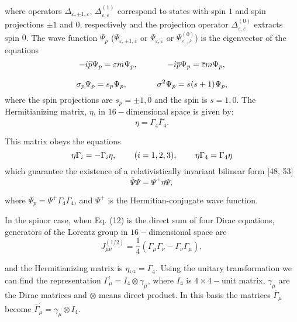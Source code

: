 \documentclass[a4paper,12pt]{article}
\begin{document}
where operators $\Delta _{\varepsilon ,\pm 1,\overline{\varepsilon
}}$, $ \Delta _{\varepsilon ,\overline{\varepsilon }}^{(1)}$
correspond to states with spin $1$ and spin projections $\pm 1$
and $0$, respectively and the projection operator $\Delta
_{\varepsilon ,\overline{\varepsilon }}^{(0)}$ extracts spin $0$.
The wave function $\Psi _p$ ($\Psi _{\varepsilon ,\pm 1,
\overline{\varepsilon }}$ or $\Psi _{\varepsilon
,\overline{\varepsilon }}$ or $\Psi _{\varepsilon
,,\overline{\varepsilon }}^{(0)}$) is the eigenvector of the
equations
\[
-i\widehat{p}\Psi _p=\varepsilon m\Psi _p ,
\hspace{0.5in}-i\overline{p}\Psi _p= \overline{\varepsilon }m\Psi
_p ,
\]
\vspace{-8mm}
\begin{equation}  \label{34}
\end{equation}
\vspace{-8mm}
\[
\sigma _p\Psi _p=s_p\Psi _p ,\hspace{0.5in}\sigma ^2\Psi
_p=s(s+1)\Psi _p ,
\]
where the spin projections are $s_p=\pm 1,0$ and the spin is $s=1,0$. The
Hermitianizing matrix, $\eta $, in $16-$dimensional space is given by:
\begin{equation}
\eta =\Gamma _4\overline{\Gamma }_4 . \label{35}
\end{equation}

This matrix obeys the equations
\[
\eta \Gamma _i=-\Gamma _i\eta ,\hspace{0.3in}(i=1,2,3) ,
\hspace{0.3in}\eta \Gamma _4=\Gamma _4\eta
\]
which guarantee the existence of a relativistically invariant
bilinear form [48, 53]
\begin{equation}
\overline{\Psi }\Psi =\Psi ^{+}\eta \Psi , \label{36}
\end{equation}

where $\overline{\Psi }_p=\Psi ^{+}\Gamma _4\overline{\Gamma }_4$, and $\Psi
^{+}$ is the Hermitian-conjugate wave function.

In the spinor case, when Eq. (12) is the direct sum of four Dirac equations,
generators of the Lorentz group in $16-$dimensional space are
\begin{equation}
J_{\mu \nu }^{(1/2)}=\frac 14\left( \Gamma _\mu \Gamma _\nu
-\Gamma _\nu \Gamma _\mu \right) , \label{37}
\end{equation}

and the Hermitianizing matrix is $\eta _{^{1/2}}=\Gamma _4$. Using the
unitary transformation we can find the representation $\Gamma _\mu ^{\prime
}=I_4\otimes \gamma _\mu $, where $I_4$ is $4\times 4-$unit matrix, $\gamma
_\mu $ are the Dirac matrices and $\otimes $ means direct product. In this
basis the matrices $\overline{\Gamma }_\mu $ become $\overline{\Gamma }_\mu
^{\prime }=\gamma _\mu \otimes I_4$.
\end{document}

